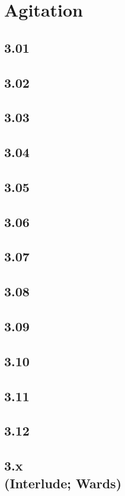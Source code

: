 \part{Agitation}

\chapter{3.01}


\chapter{3.02}


\chapter{3.03}


\chapter{3.04}


\chapter{3.05}


\chapter{3.06}


\chapter{3.07}


\chapter{3.08}


\chapter{3.09}


\chapter{3.10}


\chapter{3.11}


\chapter{3.12}


\chapter[3.x (Interlude; Wards)]{3.x\\(Interlude; Wards)}

